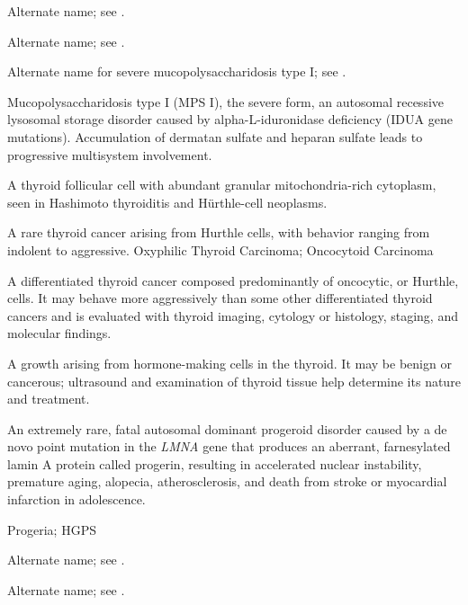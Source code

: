  Alternate name; see .

 Alternate name; see .

 Alternate name for severe mucopolysaccharidosis type I; see .

 Mucopolysaccharidosis type I (MPS I), the severe form, an autosomal recessive lysosomal
storage disorder caused by alpha-L-iduronidase deficiency (IDUA gene mutations).
Accumulation of dermatan sulfate and heparan sulfate leads to progressive multisystem
involvement.

 A thyroid follicular cell with abundant granular mitochondria-rich cytoplasm, seen in Hashimoto thyroiditis and Hürthle-cell neoplasms.

 A rare thyroid cancer arising from Hurthle cells, with behavior ranging from indolent to aggressive.
\synonyms
Oxyphilic Thyroid Carcinoma; Oncocytoid Carcinoma

 A differentiated thyroid cancer composed predominantly of oncocytic, or Hurthle, cells. It may behave more aggressively than some other differentiated thyroid cancers and is evaluated with thyroid imaging, cytology or histology, staging, and molecular findings.

 A growth arising from hormone-making cells in the thyroid. It may be benign or cancerous; ultrasound and examination of thyroid tissue help determine its nature and treatment.

 An extremely rare, fatal autosomal dominant progeroid disorder caused by a de novo point mutation in the \textit{LMNA} gene that produces an aberrant, farnesylated lamin A protein called progerin, resulting in accelerated nuclear instability, premature aging, alopecia, atherosclerosis, and death from stroke or myocardial infarction in adolescence.

\synonyms
Progeria; HGPS

 Alternate name; see .

 Alternate name; see .

